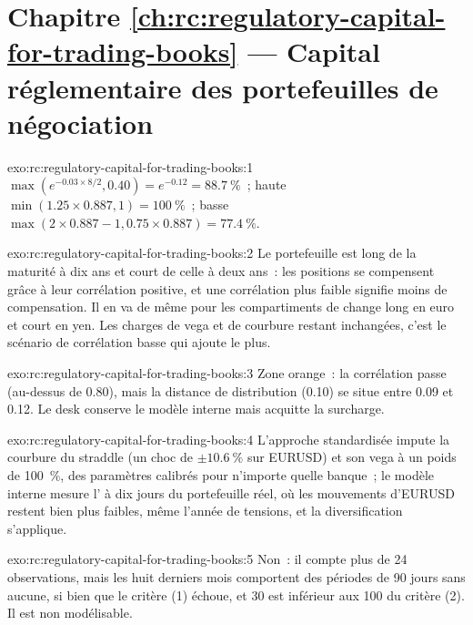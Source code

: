 \section*{Chapitre \ref{ch:rc:regulatory-capital-for-trading-books} --- Capital réglementaire des portefeuilles de négociation}

\begin{solution}{exo:rc:regulatory-capital-for-trading-books:1}
$\max(e^{-0.03\times8/2},0.40) = e^{-0.12} = 88.7~\%$~; haute $\min(1.25\times0.887,1) = 100~\%$~; basse
$\max(2\times0.887-1,0.75\times0.887) = 77.4~\%$.
\end{solution}

\begin{solution}{exo:rc:regulatory-capital-for-trading-books:2}
Le portefeuille est long de la maturité à dix ans et court de celle à deux ans~: les positions se compensent grâce à leur corrélation positive,
et une corrélation plus faible signifie moins de compensation. Il en va de même pour les compartiments de change long en euro et
court en yen. Les charges de vega et de courbure restant inchangées, c'est le scénario de corrélation basse qui ajoute le plus.
\end{solution}

\begin{solution}{exo:rc:regulatory-capital-for-trading-books:3}
Zone orange~: la corrélation passe (au-dessus de 0.80), mais la distance de distribution (0.10) se situe entre 0.09 et
0.12. Le desk conserve le modèle interne mais acquitte la surcharge.
\end{solution}

\begin{solution}{exo:rc:regulatory-capital-for-trading-books:4}
L'approche standardisée impute la courbure du straddle (un choc de $\pm10.6~\%$ sur EURUSD) et son vega à un poids de
100~\%, des paramètres calibrés pour n'importe quelle banque~; le modèle interne mesure l' à dix jours du portefeuille réel,
où les mouvements d'EURUSD restent bien plus faibles, même l'année de tensions, et la diversification
s'applique.
\end{solution}

\begin{solution}{exo:rc:regulatory-capital-for-trading-books:5}
Non~: il compte plus de 24 observations, mais les huit derniers mois comportent des périodes de 90 jours sans aucune, si bien que
le critère (1) échoue, et 30 est inférieur aux 100 du critère (2). Il est non modélisable.
\end{solution}

